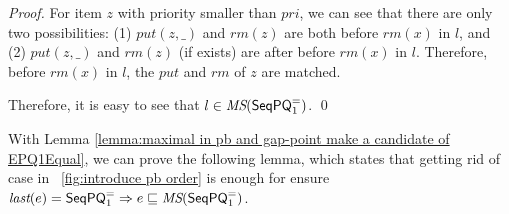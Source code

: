 \begin {proof}
For item $z$ with priority smaller than $\textit{pri}$, we can see that there are only two possibilities: (1) $\textit{put}(z,\_)$ and $\textit{rm}(z)$ are both before $\textit{rm}(x)$ in $l$, and (2) $\textit{put}(z,\_)$ and $\textit{rm}(z)$ (if exists) are after before $\textit{rm}(x)$ in $l$. Therefore, before $\textit{rm}(x)$ in $l$, the $\textit{put}$ and $\textit{rm}$ of $z$ are matched.

Therefore, it is easy to see that $l \in \textit{MS}(\mathsf{SeqPQ}_1^{=})$. \qed
\end {proof}

With Lemma \ref{lemma:maximal in pb and gap-point make a candidate of EPQ1Equal}, we can prove the following lemma, which states that getting rid of case in \figurename~\ref{fig:introduce pb order} is enough for ensure $\textit{last}(e) = \mathsf{SeqPQ}_1^{=} \Rightarrow e \sqsubseteq \textit{MS}(\mathsf{SeqPQ}_1^{=})$.


\EPQOneEqualAsPBandGP*

